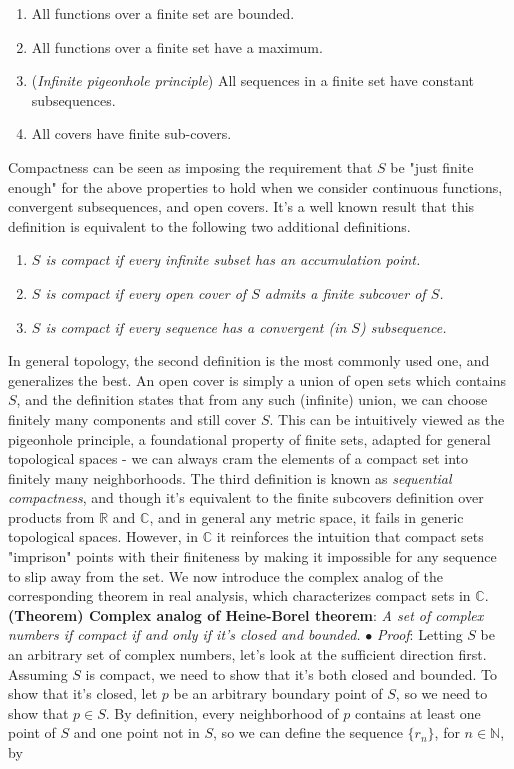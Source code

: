 \documentclass{article}
\newcommand*{\tb}{\textbf}
\newcommand*{\ti}{\textit}
\newcommand*{\n}{\newline}
\newcommand*{\nn}{\newline \newline}
\newcommand*{\Pf}{\indent \ensuremath{\bullet} \textit{Proof}: }
\newcommand*{\N}{\mathbb{N}}
\newcommand*{\R}{\mathbb{R}}
\newcommand*{\C}{\mathbb{C}}
\begin{document}
\begin{enumerate}
    \item All functions over a finite set are bounded.
    \item All functions over a finite set have a maximum.
    \item (\ti{Infinite pigeonhole principle}) All sequences in a finite set have constant subsequences.
    \item All covers have finite sub-covers.
\end{enumerate}
\indent Compactness can be seen as imposing the requirement that $ S $ be "just finite enough" for the above properties to hold when we consider continuous functions, convergent subsequences, and open covers.
\nn
It's a well known result that this definition is equivalent to the following two additional definitions.
\begin{enumerate}
    \item \ti{$ S $ is compact if every infinite subset has an accumulation point.}
    \item \ti{$ S $ is compact if every open cover of $ S $ admits a finite subcover of $ S $.}
    \item \ti{$ S $ is compact if every sequence has a convergent (in $ S $) subsequence.}
\end{enumerate}
In general topology, the second definition is the most commonly used one, and generalizes the best. An open cover is simply a union of open sets which contains $ S $, and the definition states that from any such (infinite) union, we can choose finitely many components and still cover $ S $. This can be intuitively viewed as the pigeonhole principle, a foundational property of finite sets, adapted for general topological spaces - we can always cram the elements of a compact set into finitely many neighborhoods. The third definition is known as \ti{sequential compactness}, and though it's equivalent to the finite subcovers definition over products from $ \R $ and $ \C $, and in general any metric space, it fails in generic topological spaces. However, in $ \C $ it reinforces the intuition that compact sets "imprison" points with their finiteness by making it impossible for any sequence to slip away from the set.
\n
We now introduce the complex analog of the corresponding theorem in real analysis, which characterizes compact sets in $ \C $.
\nn
\tb{(Theorem) Complex analog of Heine-Borel theorem}: \ti{A set of complex numbers if compact if and only if it's closed and bounded.}
\n
\Pf Letting $ S $ be an arbitrary set of complex numbers, let's look at the sufficient direction first. Assuming $ S $ is compact, we need to show that it's both closed and bounded. To show that it's closed, let $ p $ be an arbitrary boundary point of $ S $, so we need to show that $ p \in S $. By definition, every neighborhood of $ p $ contains at least one point of $ S $ and one point not in $ S $, so we can define the sequence $ \{ r_n \} $, for $ n \in \N $, by
\end{document}
